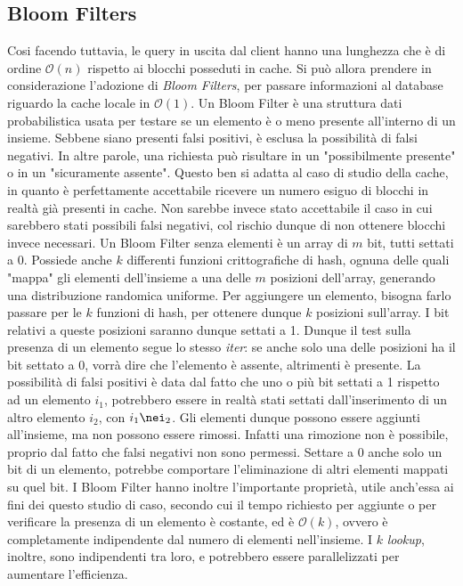 	\subsection{Bloom Filters}
	

		Cosi facendo tuttavia, le query in uscita dal client hanno una lunghezza che è di ordine $\mathcal{O}(n)$ rispetto ai blocchi posseduti in cache. Si può allora prendere in considerazione l'adozione di \textit{Bloom Filters}, per passare informazioni al database riguardo la cache locale in $\mathcal{O}(1)$.
		Un Bloom Filter è una struttura dati probabilistica usata per testare se un elemento è o meno presente all'interno di un insieme. Sebbene siano presenti falsi positivi, è esclusa la possibilità di falsi negativi. In altre parole, una richiesta può risultare in un "possibilmente presente" o in un "sicuramente assente". Questo ben si adatta al caso di studio della cache, in quanto è perfettamente accettabile ricevere un numero esiguo di blocchi in realtà già presenti in cache. Non sarebbe invece stato accettabile il caso in cui sarebbero stati possibili falsi negativi, col rischio dunque di non ottenere blocchi invece necessari.
		Un Bloom Filter senza elementi è un array di $ m $ bit, tutti settati a 0. Possiede anche $ k $ differenti funzioni crittografiche di hash, ognuna delle quali "mappa" gli elementi dell'insieme a una delle $ m $ posizioni dell'array, generando una distribuzione randomica uniforme. Per aggiungere un elemento, bisogna farlo passare per le $ k $ funzioni di hash, per ottenere dunque $ k $ posizioni sull'array. I bit relativi a queste posizioni saranno dunque settati a 1. Dunque il test sulla presenza di un elemento segue lo stesso \textit{iter}: se anche solo una delle posizioni ha il bit settato a 0, vorrà dire che l'elemento è assente, altrimenti è presente. La possibilità di falsi positivi è data dal fatto che uno o più bit settati a 1 rispetto ad un elemento $ i_{1} $, potrebbero essere in realtà stati settati dall'inserimento di un altro elemento $ i_{2} $, con $ i_{1}\nei_{2} $.	
		Gli elementi dunque possono essere aggiunti all'insieme, ma non possono essere rimossi. Infatti una rimozione non è possibile, proprio dal fatto che falsi negativi non sono permessi. Settare a 0 anche solo un bit di un elemento, potrebbe comportare l'eliminazione di altri elementi mappati su quel bit.
		I Bloom Filter hanno inoltre l'importante proprietà, utile anch'essa ai fini dei questo studio di caso, secondo cui il tempo richiesto per aggiunte o per verificare la presenza di un elemento è costante, ed è $\mathcal{O}(k)$, ovvero è completamente indipendente dal numero di elementi nell'insieme. I $ k $ \textit{lookup}, inoltre, sono indipendenti tra loro, e potrebbero essere parallelizzati per aumentare l'efficienza.
		
